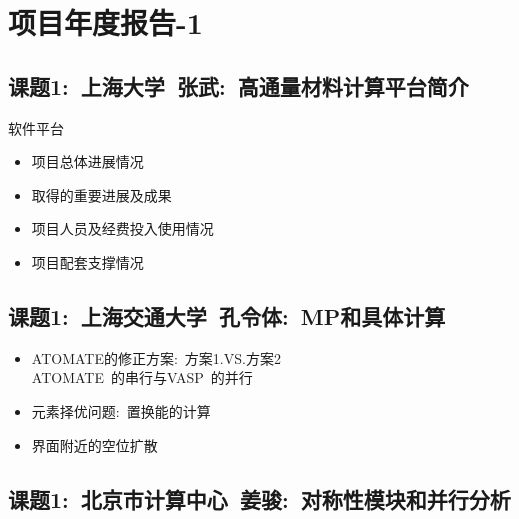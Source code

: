 \documentclass[10pt,a4paper]{article}
\begin{document}
\section{项目年度报告-1}
\subsection{课题1:~上海大学~张武:~高通量材料计算平台简介}
软件平台
\begin{itemize}
	\item 项目总体进展情况
	\item 取得的重要进展及成果
	\item 项目人员及经费投入使用情况
	\item 项目配套支撑情况
\end{itemize}

\subsection{课题1:~上海交通大学~孔令体:~\rm{MP}和具体计算}
\begin{itemize}
	\item \textrm{ATOMATE}的修正方案:~方案1\textrm{.VS.}方案2\\
		\textrm{ATOMATE}~的串行与\textrm{VASP}~的并行
	\item 元素择优问题:~置换能的计算
	\item 界面附近的空位扩散
\end{itemize}
\subsection{课题1:~北京市计算中心~姜骏:~对称性模块和并行分析}
\end{document}
